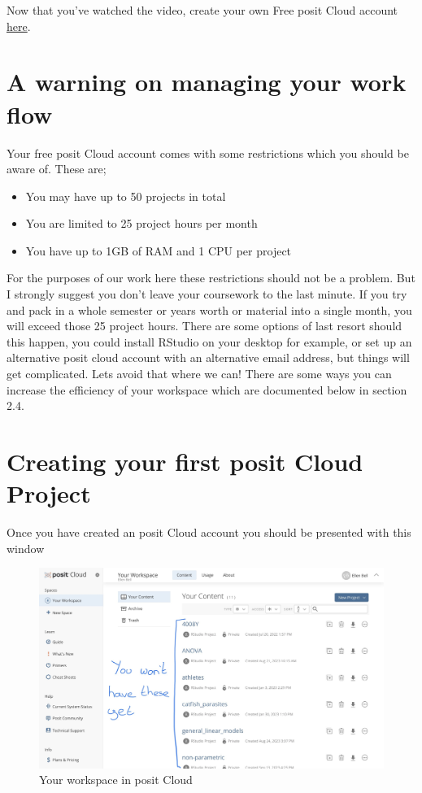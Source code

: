 \documentclass[
]{book}
\providecommand{\tightlist}{%
  \setlength{\itemsep}{0pt}\setlength{\parskip}{0pt}}
\begin{document}
Now that you've watched the video, create your own Free posit Cloud account \href{https://login.rstudio.cloud/login?redirect=\%2Foauth\%2Fauthorize\%3Fredirect_uri\%3Dhttps\%253A\%252F\%252Frstudio.cloud\%252Flogin\%26client_id\%3Drstudio-cloud\%26response_type\%3Dcode\%26show_auth\%3D0\%26show_login\%3D1}{here}.

\section{A warning on managing your work flow}\label{a-warning-on-managing-your-work-flow}

Your free posit Cloud account comes with some restrictions which you should be aware of. These are;

\begin{itemize}
\tightlist
\item
  You may have up to 50 projects in total
\item
  You are limited to 25 project hours per month
\item
  You have up to 1GB of RAM and 1 CPU per project
\end{itemize}

For the purposes of our work here these restrictions should not be a problem. But I strongly suggest you don't leave your coursework to the last minute. If you try and pack in a whole semester or years worth or material into a single month, you will exceed those 25 project hours. There are some options of last resort should this happen, you could install RStudio on your desktop for example, or set up an alternative posit cloud account with an alternative email address, but things will get complicated. Lets avoid that where we can! There are some ways you can increase the efficiency of your workspace which are documented below in section 2.4.

\section{Creating your first posit Cloud Project}\label{creating-your-first-posit-cloud-project}

Once you have created an posit Cloud account you should be presented with this window

\begin{figure}
\includegraphics[width=0.9\linewidth]{figures/posit1} \caption{Your workspace in posit Cloud}\label{fig:unnamed-chunk-1}
\end{figure}
\end{document}
